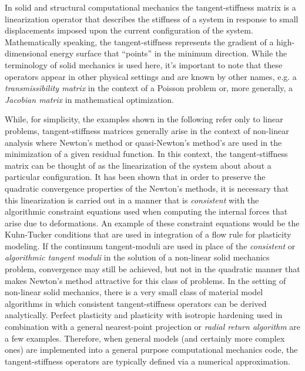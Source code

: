\documentclass[preprint,12pt]{elsarticle}
\begin{document}
In solid and structural computational mechanics the tangent-stiffness matrix is
a linearization operator that describes the stiffness of a system in response
to small displacements imposed upon the current configuration of the system.
Mathematically speaking, the tangent-stiffness represents the gradient of a
high-dimensional energy surface that ``points'' in the minimum direction. While
the terminology of solid mechanics is used here, it's important to note that
these operators appear in other physical settings and are known by other names,
e.g. a \emph{transmissibility matrix} in the context of a Poisson problem or,
more generally, a \emph{Jacobian matrix} in mathematical optimization.

While, for simplicity, the examples shown in the following refer only to linear
problems, tangent-stiffness matrices generally arise in the context of
non-linear analysis where Newton's method or quasi-Newton's method's are used
in the minimization of a given residual function.  In this context, the
tangent-stiffness matrix can be thought of as the linearization of the system
about about a particular configuration.  It has been shown
\cite{hughes1978consistent,hughes1978unconditionally} that in order to preserve
the quadratic convergence properties of the Newton's methods, it is necessary
that this linearization is carried out in a manner that is \emph{consistent}
with the algorithmic constraint equations used when computing the internal
forces that arise due to deformations.  An example of these constraint
equations would be the Kuhn-Tucker conditions \cite{simo1998} that are used in
integration of a flow rule for plasticity modeling.  If the continuum
tangent-moduli are used in place of the \emph{consistent} or \emph{algorithmic
tangent moduli} in the solution of a non-linear solid mechanics problem,
convergence may still be achieved, but not in the quadratic manner that makes
Newton's method attractive for this class of problems.  In the setting of
non-linear solid mechanics, there is a very small class of material model
algorithms in which consistent tangent-stiffness operators can be derived
analytically.  Perfect plasticity and plasticity with isotropic hardening used
in combination with a general nearest-point projection or \emph{radial return
algorithm} are a few examples.  Therefore, when general models (and certainly
more complex ones) are implemented into a general purpose computational
mechanics code, the tangent-stiffness operators are typically defined via a
numerical approximation.  
\end{document}
